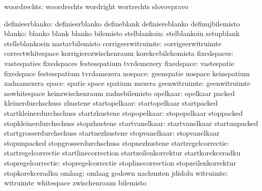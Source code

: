                   woordrechts:  woordrechts                  wordright
                                wortrechts                   slovovpravo

              definieerblanko:  definieerblanko              defineblank
                                definiereblanko              definujbilemisto
                       blanko:  blanko                       blank
                                blanko                       bilemisto
                 stelblankoin:  stelblankoin                 setupblank
                                stelleblankoein              nastavbilemisto
           corrigeerwitruimte:  corrigeerwitruimte           correctwhitespace
                                korrigierezwischenraum       korekcebilehomista
                  fixedspaces:  vastespaties                 fixedspaces
                                festesspatium                tvrdemezery
                   fixedspace:  vastespatie                  fixedspace 
                                festesspatium                tvrdamezera
                      nospace:  geenspatie                   nospace
                                keinspatium                  zadnamezera
                        space:  spatie                       space
                                spatium                      mezera
                geenwitruimte:  geenwitruimte                nowhitespace
                                keinzwischenraum             zadnebilemisto
                     opelkaar:  opelkaar                     packed
                                kleinerdurchschuss           zhustene
                startopelkaar:  startopelkaar                startpacked
                                startkleinerdurchschuss      startzhustene
                 stopopelkaar:  stopopelkaar                 stoppacked
                                stopkleinerdurchschuss       stopzhustene
               startvanelkaar:  startvanelkaar               startunpacked
                                startgrosserdurchschuss      startnezhustene
                stopvanelkaar:  stopvanelkaar                stopunpacked
                                stopgrosserdurchschuss       stopnezhustene
          startregelcorrectie:  startregelcorrectie          startlinecorrection
                                startzeilenkorrektur         startkorekceradku
           stopregelcorrectie:  stopregelcorrectie           stoplinecorrection
                                stopzeilenkorrektur          stopkorekceradku
                       omlaag:  omlaag                       godown
                                nachunten                    jdidolu
                    witruimte:  witruimte                    whitespace
                                zwischenraum                 bilemisto

